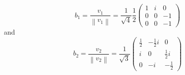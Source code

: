 \documentclass[12pt]{article}
\newcommand\norm[1]{\left\lVert#1\right\rVert}
\theoremstyle{definition}
\begin{document}
\begin{enumerate}
\begin{enumerate}
  \[
b_1 = \frac{v_1}{\norm{v_1}}=\frac{1}{\sqrt{4}}\frac{1}{2}\begin{pmatrix}1&i&0\\0&0&-1\\0&0&-1\end{pmatrix}
  \]
  and
  \[
b_2 = \frac{v_2}{\norm{v_2}} = \frac{1}{\sqrt{3}}\begin{pmatrix}\frac{1}{2}&-\frac{1}{2}i&0\\i&0&\frac{1}{2}i\\0&-i&-\frac{1}{2}\end{pmatrix}
  \]
\end{enumerate}
\end{enumerate}
\end{document}

